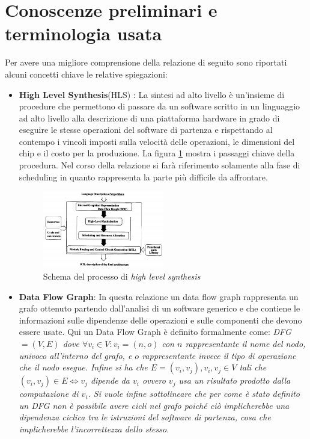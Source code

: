 \documentclass[]{IEEEtran}
\begin{document}
\section{Conoscenze preliminari e terminologia usata}

Per avere una migliore comprensione della relazione di seguito sono riportati alcuni concetti chiave le relative spiegazioni:
\begin{itemize}
	\item \textbf{High Level Synthesis}(HLS) \cite{HLS}: La sintesi ad alto livello è un'insieme di procedure che permettono di passare da un software scritto in un linguaggio ad alto livello alla descrizione di una piattaforma hardware in grado di eseguire le stesse operazioni del software di partenza e rispettando al contempo i vincoli imposti sulla velocità delle operazioni, le dimensioni del chip e il costo per la produzione. La figura \ref{hls} mostra i passaggi chiave della procedura. Nel corso della relazione si farà riferimento solamente alla fase di scheduling in quanto rappresenta la parte più difficile da affrontare.
	\begin{figure}[htp]
		\centering
		\includegraphics[width=0.5\textwidth]{images/Hls_flow.png}
		\caption{Schema del processo di \emph{high level synthesis}}
		\label{hls}
	\end{figure}
	
	\item \textbf{Data Flow Graph}: In questa relazione un data flow graph rappresenta un grafo ottenuto partendo dall'analisi di un software generico e che contiene le informazioni sulle dipendenze delle operazioni e sulle componenti che devono essere usate. Qui un Data Flow Graph è definito formalmente come:
	\it{DFG} \normalfont $=(V,E)$ dove $\forall v_i\in V : v_i = (n,o)$ con $n$ rappresentante il nome del nodo, \emph{univoco} all'interno del grafo, e $o$ rappresentante invece il tipo di operazione che il nodo esegue. Infine si ha che $E = {(v_i,v_j)}, v_i,v_j \in V$ tali che $(v_i,v_j) \in E \iff v_j$ dipende da $v_i$ ovvero $v_j$ usa un risultato prodotto dalla computazione di $v_i$. Si vuole infine sottolineare che per come è stato definito un DFG non è possibile avere cicli nel grafo poiché ciò implicherebbe una dipendenza ciclica tra le istruzioni del software di partenza, cosa che implicherebbe l'incorrettezza dello stesso.
	

\end{itemize}
\end{document}
